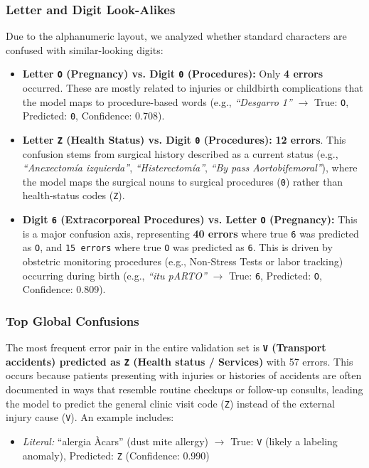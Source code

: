 \documentclass[11pt,a4paper]{article}
\begin{document}
\subsubsection{Letter and Digit Look-Alikes}
Due to the alphanumeric layout, we analyzed whether standard characters are confused with similar-looking digits:
\begin{itemize}
    \item \textbf{Letter \texttt{O} (Pregnancy) vs. Digit \texttt{0} (Procedures):} Only \textbf{4 errors} occurred. These are mostly related to injuries or childbirth complications that the model maps to procedure-based words (e.g., \textit{``Desgarro 1''} $\rightarrow$ True: \texttt{O}, Predicted: \texttt{0}, Confidence: 0.708).
    \item \textbf{Letter \texttt{Z} (Health Status) vs. Digit \texttt{0} (Procedures):} \textbf{12 errors}. This confusion stems from surgical history described as a current status (e.g., \textit{``Anexectomía izquierda''}, \textit{``Histerectomía''}, \textit{``By pass Aortobifemoral''}), where the model maps the surgical nouns to surgical procedures (\texttt{0}) rather than health-status codes (\texttt{Z}).
    \item \textbf{Digit \texttt{6} (Extracorporeal Procedures) vs. Letter \texttt{O} (Pregnancy):} This is a major confusion axis, representing \textbf{40 errors} where true \texttt{6} was predicted as \texttt{O}, and \texttt{15 errors} where true \texttt{O} was predicted as \texttt{6}. This is driven by obstetric monitoring procedures (e.g., Non-Stress Tests or labor tracking) occurring during birth (e.g., \textit{``itu pARTO''} $\rightarrow$ True: \texttt{6}, Predicted: \texttt{O}, Confidence: 0.809).
\end{itemize}

\subsubsection{Top Global Confusions}
The most frequent error pair in the entire validation set is \textbf{\texttt{V} (Transport accidents) predicted as \texttt{Z} (Health status / Services)} with 57 errors. 
This occurs because patients presenting with injuries or histories of accidents are often documented in ways that resemble routine checkups or follow-up consults, leading the model to predict the general clinic visit code (\texttt{Z}) instead of the external injury cause (\texttt{V}). An example includes:
\begin{itemize}
    \item \textit{Literal:} ``alergia Àcars'' (dust mite allergy) $\rightarrow$ True: \texttt{V} (likely a labeling anomaly), Predicted: \texttt{Z} (Confidence: 0.990)
\end{itemize}
\end{document}
